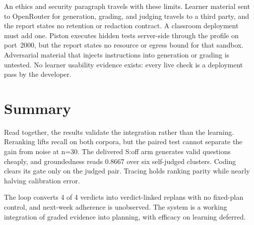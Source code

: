 An ethics and security paragraph travels with these limits. Learner material sent to OpenRouter for generation, grading, and judging travels to a third party, and the report states no retention or redaction contract. A classroom deployment must add one. Piston executes hidden tests server-side through the profile on port~2000, but the report states no resource or egress bound for that sandbox. Adversarial material that injects instructions into generation or grading is untested. No learner usability evidence exists: every live check is a deployment pass by the developer.

\section{Summary}
Read together, the results validate the integration rather than the learning. Reranking lifts recall on both corpora, but the paired test cannot separate the gain from noise at n=30. The delivered S:off arm generates valid questions cheaply, and groundedness reads 0.8667 over six self-judged clusters. Coding clears its gate only on the judged pair. Tracing holds ranking parity while nearly halving calibration error.

The loop converts 4 of 4 verdicts into verdict-linked replans with no fixed-plan control, and next-week adherence is unobserved. The system is a working integration of graded evidence into planning, with efficacy on learning deferred.
